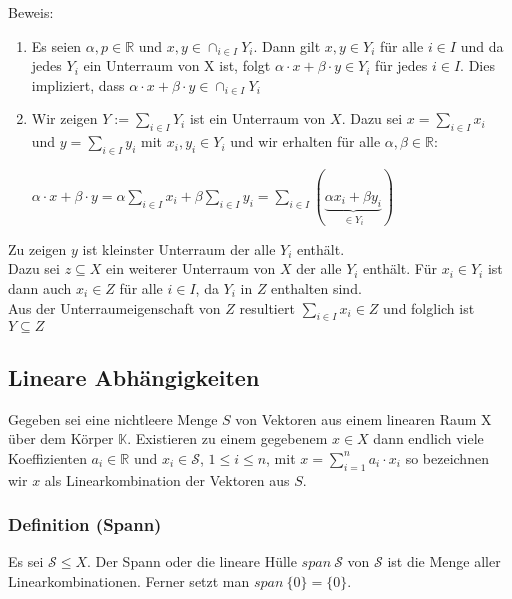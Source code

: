 Beweis:
\begin{enumerate}
\item Es seien $\alpha,p\in \mathbb{R}$ und $x,y\in \displaystyle\cap_{i\in I} Y_i$. Dann gilt $x,y \in Y_i$ für alle $i\in I$ und da jedes $Y_i$ ein Unterraum von X ist, folgt $\alpha\cdot x+\beta\cdot y \in Y_i$ für jedes $i\in I$. Dies impliziert, dass $\alpha\cdot x+\beta\cdot y \in \displaystyle\cap_{i\in I} Y_i$
\item Wir zeigen $\displaystyle Y := \sum_{i\in I} Y_i$ ist ein Unterraum von $X$. Dazu sei $\displaystyle x=\sum_{i\in I} x_i$ und $\displaystyle y=\sum_{i\in I} y_i$ mit $x_i,y_i\in Y_i$ und wir erhalten für alle $\alpha,\beta \in \mathbb{R}$:

$\displaystyle\alpha \cdot x+\beta\cdot y=\alpha\sum_{i\in I}x_i+\beta\sum_{i\in I} y_i=\sum_{i\in I}(\underbrace{\alpha x_i+\beta y_i}_{\in Y_i})$
\end{enumerate}
Zu zeigen $y$ ist kleinster Unterraum der alle $Y_i$ enthält.\\
Dazu sei $z\subseteq X$ ein weiterer Unterraum von $X$ der alle $Y_i$ enthält. Für $x_i\in Y_i$ ist dann auch $x_i\in Z$ für alle $i\in I$, da $Y_i$ in $Z$ enthalten sind.\\
Aus der Unterraumeigenschaft von $Z$ resultiert $\displaystyle\sum_{i\in I} x_i \in Z$ und folglich ist $Y\subseteq Z$
\subsection{Lineare Abhängigkeiten}
Gegeben sei eine nichtleere Menge $S$ von Vektoren aus einem linearen Raum X über dem Körper $\mathbb{K}$. Existieren zu einem gegebenem $x\in X$ dann endlich viele Koeffizienten $a_i\in\mathbb{R}$ und $x_i\in\mathcal{S}$, $1\leq i\leq n$, mit $\displaystyle x=\sum^{n}_{i=1} a_i \cdot x_i$  so bezeichnen wir $x$ als Linearkombination der Vektoren aus $S$.
\subsubsection{Definition (Spann)}
Es sei $\mathcal{S} \leq X$. Der Spann oder die lineare Hülle $span\ \mathcal{S}$ von $\mathcal{S}$ ist die Menge aller Linearkombinationen. Ferner setzt man $span\ \{0\}=\{0\}$.
